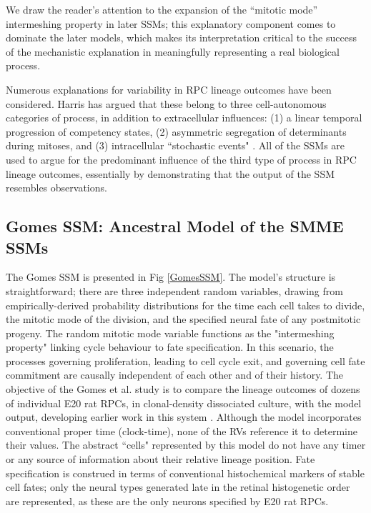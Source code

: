 We draw the reader's attention to the expansion of the ``mitotic mode'' intermeshing property in later SSMs; this explanatory component comes to dominate the later models, which makes its interpretation critical to the success of the mechanistic explanation in meaningfully representing a real biological process. 

Numerous explanations for variability in RPC lineage outcomes have been considered. Harris has argued that these belong to three cell-autonomous categories of process, in addition to extracellular influences: (1) a linear temporal progression of competency states, (2) asymmetric segregation of determinants during mitoses, and (3) intracellular ``stochastic events" \cite{Holt1988,Agathocleous2009}. All of the SSMs are used to argue for the predominant influence of the third type of process in RPC lineage outcomes, essentially by demonstrating that the output of the SSM resembles observations.
 
 \subsection{Gomes SSM: Ancestral Model of the SMME SSMs}
 
The Gomes SSM is presented in Fig \ref{GomesSSM}. The model's structure is straightforward; there are three independent random variables, drawing from empirically-derived probability distributions for the time each cell takes to divide, the mitotic mode of the division, and the specified neural fate of any postmitotic progeny. The random mitotic mode variable functions as the "intermeshing property" linking cycle behaviour to fate specification. In this scenario, the processes governing proliferation, leading to cell cycle exit, and governing cell fate commitment are causally independent of each other and of their history. The objective of the Gomes et al. study is to compare the lineage outcomes of dozens of individual E20 rat RPCs, in clonal-density dissociated culture, with the model output, developing earlier work in this system \cite{Cayouette2003}. Although the model incorporates conventional proper time (clock-time), none of the RVs reference it to determine their values. The abstract ``cells" represented by this model do not have any timer or any source of information about their relative lineage position.  Fate specification is construed in terms of conventional histochemical markers of stable cell fates; only the neural types generated late in the retinal histogenetic order are represented, as these are the only neurons specified by E20 rat RPCs.
 
